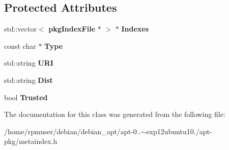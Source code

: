 \subsection*{\-Protected \-Attributes}
\begin{DoxyCompactItemize}
\item 
std\-::vector$<$ {\bf pkg\-Index\-File} $\ast$ $>$ $\ast$ {\bfseries \-Indexes}\label{classmetaIndex_ab92f49deba36733457279ebfca030de5}

\item 
const char $\ast$ {\bfseries \-Type}\label{classmetaIndex_aecb2a77585d977302e747b9dec093750}

\item 
std\-::string {\bfseries \-U\-R\-I}\label{classmetaIndex_aaf8eea5037c53d12d3f31ab9e032712c}

\item 
std\-::string {\bfseries \-Dist}\label{classmetaIndex_a33081b77174947a0be46935e0defd3c5}

\item 
bool {\bfseries \-Trusted}\label{classmetaIndex_a224b67941df4d54b46be8dd05390428f}

\end{DoxyCompactItemize}


\-The documentation for this class was generated from the following file\-:\begin{DoxyCompactItemize}
\item 
/home/rpmuser/debian/debian\-\_\-apt/apt-\/0..$\sim$exp12ubuntu10./apt-\/pkg/metaindex.\-h\end{DoxyCompactItemize}

